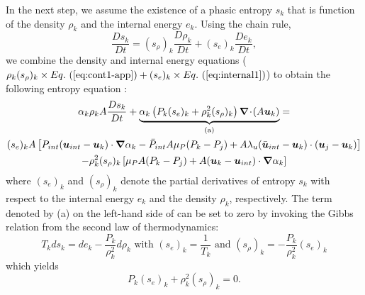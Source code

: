 \begin{appendices}
In the next step, we assume the existence of a phasic entropy $s_k$ that is function of the density $\rho_k$ and the  internal energy $e_k$. Using the chain rule, 
\begin{equation}
\frac{Ds_k}{Dt} = (s_\rho)_k \frac{D \rho_k}{Dt} + (s_e)_k \frac{De_k}{Dt},
\end{equation}
we combine the density and internal energy equations ($\rho_k (s_\rho)_k \times \eqt{eq:cont1-app}  + (s_e)_k \times \eqt{eq:internal1}$) to obtain  the following entropy equation :
\begin{multline}
\label{eq:ent1}
\alpha_k \rho_k A \frac{Ds_k}{Dt} + 
\underbrace{\alpha_k \left( P_k (s_e)_k + \rho_k^2 (s_\rho)_k \right)  \boldsymbol\nabla\! \cdot \! \left( A \boldsymbol u_k \right) }_\textrm{(a)} = \\
(s_e)_k A \left[ P_{int}(\boldsymbol u_{int}-\boldsymbol u_k)\cdot \boldsymbol\nabla \alpha_k - \bar{P}_{int} A \mu_P (P_k-P_j) + A \lambda_u (\bar{\boldsymbol u}_{int}-\boldsymbol u_k) \cdot (\boldsymbol u_j-\boldsymbol u_k)\right] \\
- \rho_k^2 (s_\rho)_k \left[ \mu_P A (P_k-P_j) + A(\boldsymbol u_k-\boldsymbol u_{int}) \cdot \boldsymbol\nabla \alpha_k\right] 
\end{multline}
where $(s_e)_k$ and $(s_\rho)_k$ denote the partial derivatives of entropy $s_k$ with respect to the internal energy $e_k$ and the density $\rho_k$, respectively.
The term denoted by (a) on the left-hand side of  can be set to zero by invoking the Gibbs relation from the second law of thermodynamics:
\begin{equation}
T_k ds_k = de_k - \frac{P_k}{\rho_k^2} d \rho_k \text{ with } (s_e)_k = \frac{1}{T_k} \text{ and } (s_\rho)_k = - \frac{P_k}{\rho_k^2} (s_e)_k
\end{equation}
which yields
\begin{equation}
\label{eq:ent2}
 P_k (s_e)_k + \rho_k^2 (s_\rho)_k = 0 .
\end{equation} 


\end{appendices}

